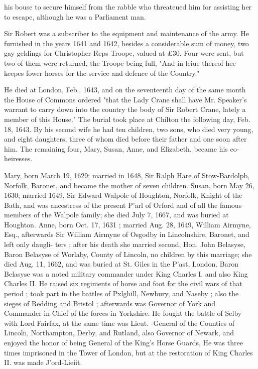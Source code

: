 \documentclass[oneside]{book}
\begin{document}
his bouse to secure himself from the rabble who threateued him 
for assisting her to escape, although he was a Parliament man. 

Sir Robert was a subscriber to the equipment and maintenance 
of the army. He furnished in the years 1641 and 1642, besides 
a considerable sum of money, two gay geldings for Christopher 
Reps Troope, valued at £30. Four were sent, but two of them 
were returned, the Troope being full, "And in leiue thereof hee 
keepes fower horses for the service and defence of the Country." 

He died at London, Feb., 1643, and on the seventeenth day of 
the same month the House of Commons ordered "that the Lady 
Crane shall have Mr. Speaker's warrant to carry down into the 
country the body of Sir Robert Crane, lately a member of this 
House." The burial took place at Chilton the following day, 
Feb. 18, 1643. By his second wife he had ten children, two 
sons, who died very young, and eight daughters, three of whom 
died before their father and one soon after him. The remaining 
four, Mary, Susan, Anne, and Elizabeth, became his co-heiresses. 

Mary, born March 19, 1629; married in 1648, Sir Ralph Hare 
of Stow-Bardolpb, Norfolk, Baronet, and became the mother of 
seven children. Susan, born May 26, 1630; married 1649, Sir 
Edward Walpole of Houghton, Norfolk, Knight of the Bath, and 
was ancestress of the present P'arl of Orford and of all the famous 
members of the Walpole family; she died July 7, 1667, and 
was buried at Houghton. Anne, born Oct. 17, 1631 ; married 
Aug. 28, 1649, William Airmyne, Esq., afterwards Sir William 
Airmyne of Osgodby in Lincolnshire, Baronet, and left only daugli- 
ters ; after his death she married second, Hon. John Belasyse, 
Baron Belasyse of Worlaby, County of Lincoln, no children by 
this marriage; she died Aug. 11, 1662, and was buried at St. 
Giles in the P'ast, London. Baron Belasyse was a noted military 
commander under King Charles I. and also King Charles II. 
He raised six regiments of horse and foot for the civil wars of 
that period ; took part in the battles of Pxlghill, Newbury, and 
Naseby ; also the sieges of Redding and Bristol ; afterwards was 
Governor of York and Commander-in-Chief of the forces in 
Yorkshire. He fought the battle of Selby with Lord Fairfax, at 
the same time was Lieut. -General of the Counties of Lincoln, 
Northampton, Derby, and Rutland, also Governor of Newark, 
and enjoyed the honor of being General of the King's Horse 
Guards, He was three times imprisoned in the Tower of London, 
but at the restoration of King Charles II. was made J'ord-Lieiit. 
\end{document}
